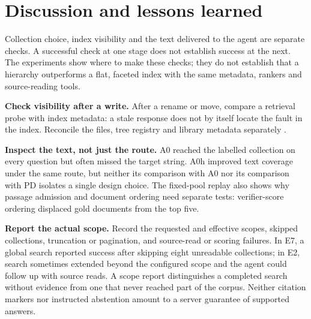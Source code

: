 \section{Discussion and lessons learned}
\label{sec:discussion}
Collection choice, index visibility and the text delivered to the agent are
separate checks. A successful check at one stage does not establish success
at the next. The experiments show where to make these checks; they do not
establish that a hierarchy outperforms a flat, faceted index with the same
metadata, rankers and source-reading tools.

\textbf{Check visibility after a write.} After a rename or move, compare a
retrieval probe with index metadata: a stale response does not by itself
locate the fault in the index. Reconcile the files, tree registry and library
metadata separately \citep{park-metadata-quality-2009,paivarinta-ecm-2005}.

\textbf{Inspect the text, not just the route.} A0 reached the labelled
collection on every question but often missed the target string. A0h improved
text coverage under the same route, but neither its comparison with A0 nor
its comparison with PD isolates a single design choice. The fixed-pool replay
also shows why passage admission and document ordering need separate tests:
verifier-score ordering displaced gold documents from the top five.

\textbf{Report the actual scope.} Record the requested and effective scopes,
skipped collections, truncation or pagination, and source-read or scoring
failures. In E7, a global search reported success after skipping eight
unreadable collections; in E2, search sometimes extended beyond the
configured scope and the agent could follow up with source reads. A scope
report distinguishes a completed search without evidence from one that
never reached part of the corpus. Neither citation markers nor instructed
abstention amount to a server guarantee of supported answers.
